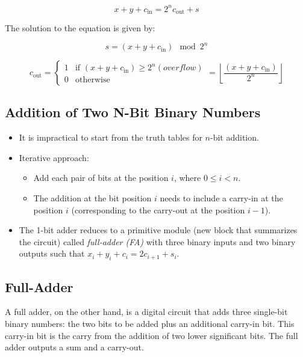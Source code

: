 \documentclass[12pt,openany, tikz,border=10pt]{book}
\begin{document}
\begin{equation}
    x + y + c_{\text{in}} = 2^n c_{\text{out}} + s
\end{equation}

The solution to the equation is given by:

\begin{equation}
    s = (x + y + c_{\text{in}}) \mod 2^n
\end{equation}

\begin{equation}
    c_{\text{out}} = 
    \begin{cases} 
        1 & \text{if } (x + y + c_{\text{in}}) \geq 2^n (overflow)\\
        0 & \text{otherwise}
    \end{cases}
    = \left\lfloor \frac{(x + y + c_{\text{in}})}{2^n} \right\rfloor
\end{equation}
\subsection{Addition of Two N-Bit Binary Numbers}

\begin{itemize}
  \item[] It is impractical to start from the truth tables for \( n \)-bit addition.
  \item[] Iterative approach:
  \begin{itemize}
    \item[] Add each pair of bits at the position \( i \), where \( 0 \leq i < n \).
    \item[] The addition at the bit position \( i \) needs to include a carry-in at the position \( i \) (corresponding to the carry-out at the position \( i - 1 \)).
  \end{itemize}
  \item[] The 1-bit adder reduces to a primitive module (new block that summarizes the circuit) called \textit{full-adder (FA)} with three binary inputs and two binary outputs such that \newline \( x_i + y_i + c_i = 2c_{i+1} + s_i \).
\end{itemize}
\newpage
\subsection{Full-Adder}
A full adder, on the other hand, is a digital circuit that adds three single-bit binary numbers: the two bits to be added plus an additional carry-in bit. This carry-in bit is the carry from the addition of two lower significant bits. The full adder outputs a sum and a carry-out.
\end{document}
